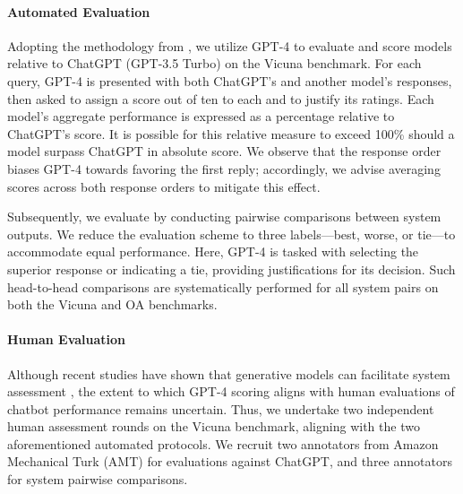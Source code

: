 \paragraph{Automated Evaluation} Adopting the methodology from \citet{vicuna2023}, we utilize GPT-4 to evaluate and score models relative to ChatGPT (GPT-3.5 Turbo) on the Vicuna benchmark. For each query, GPT-4 is presented with both ChatGPT's and another model's responses, then asked to assign a score out of ten to each and to justify its ratings. Each model’s aggregate performance is expressed as a percentage relative to ChatGPT's score. It is possible for this relative measure to exceed 100\% should a model surpass ChatGPT in absolute score. We observe that the response order biases GPT-4 towards favoring the first reply; accordingly, we advise averaging scores across both response orders to mitigate this effect.

Subsequently, we evaluate by conducting pairwise comparisons between system outputs. We reduce the evaluation scheme to three labels—best, worse, or tie—to accommodate equal performance. Here, GPT-4 is tasked with selecting the superior response or indicating a tie, providing justifications for its decision. Such head-to-head comparisons are systematically performed for all system pairs on both the Vicuna and OA benchmarks.

\paragraph{Human Evaluation} Although recent studies have shown that generative models can facilitate system assessment \citep{fu2023gptscore}, the extent to which GPT-4 scoring aligns with human evaluations of chatbot performance remains uncertain. Thus, we undertake two independent human assessment rounds on the Vicuna benchmark, aligning with the two aforementioned automated protocols. We recruit two annotators from Amazon Mechanical Turk (AMT) for evaluations against ChatGPT, and three annotators for system pairwise comparisons.

